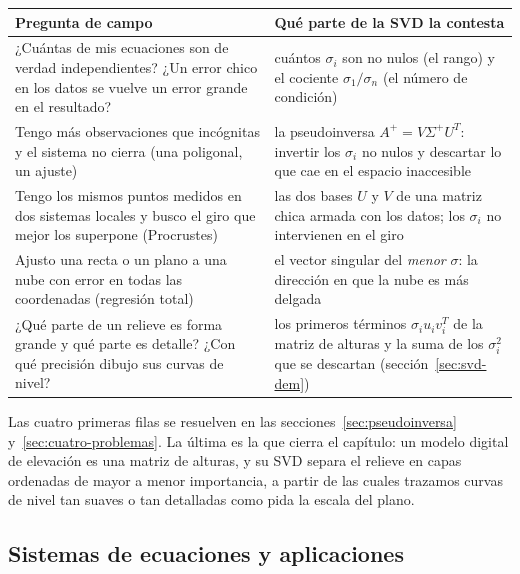 {\small
\begin{center}
\begin{tabularx}{.94\textwidth}{>{\raggedright\arraybackslash}p{} Y}
\toprule
Pregunta de campo & Qué parte de la SVD la contesta\\
\midrule
¿Cuántas de mis ecuaciones son de verdad independientes? ¿Un error chico en los datos se
vuelve un error grande en el resultado? &
cuántos \(\sigma_i\) son no nulos (el rango) y el cociente \(\sigma_1/\sigma_n\) (el
número de condición)\\
Tengo más observaciones que incógnitas y el sistema no cierra (una poligonal, un ajuste) &
la pseudoinversa \(A^{+}=V\Sigma^{+}U^T\): invertir los \(\sigma_i\) no nulos y descartar
lo que cae en el espacio inaccesible\\
Tengo los mismos puntos medidos en dos sistemas locales y busco el giro que mejor los
superpone (Procrustes) &
las dos bases \(U\) y \(V\) de una matriz chica armada con los datos; los \(\sigma_i\) no
intervienen en el giro\\
Ajusto una recta o un plano a una nube con error en todas las coordenadas (regresión total) &
el vector singular del \emph{menor} \(\sigma\): la dirección en que la nube es más delgada\\
¿Qué parte de un relieve es forma grande y qué parte es detalle? ¿Con qué precisión dibujo
sus curvas de nivel? &
los primeros términos \(\sigma_iu_iv_i^T\) de la matriz de alturas y la suma de los
\(\sigma_i^2\) que se descartan (sección~\ref{sec:svd-dem})\\
\bottomrule
\end{tabularx}
\end{center}
}

Las cuatro primeras filas se resuelven en las secciones~\ref{sec:pseudoinversa}
y~\ref{sec:cuatro-problemas}. La última es la que cierra el capítulo: un modelo digital de
elevación es una matriz de alturas, y su SVD separa el relieve en capas ordenadas de mayor
a menor importancia, a partir de las cuales trazamos curvas de nivel tan suaves o tan
detalladas como pida la escala del plano.


\subsection{Sistemas de ecuaciones y aplicaciones}\label{sec:sistemas-ecuaciones}

